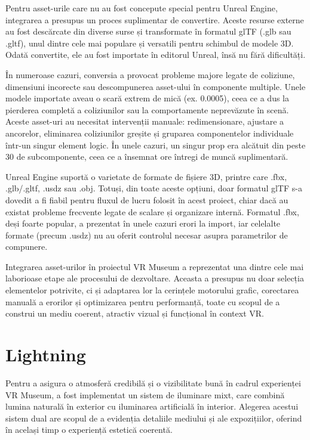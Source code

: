Pentru asset-urile care nu au fost concepute special pentru Unreal Engine, integrarea a presupus un proces suplimentar de convertire. Aceste resurse externe au fost descărcate din diverse surse și transformate în formatul glTF (.glb sau .gltf), unul dintre cele mai populare și versatili pentru schimbul de modele 3D. Odată convertite, ele au fost importate în editorul Unreal, însă nu fără dificultăți.

În numeroase cazuri, conversia a provocat probleme majore legate de coliziune, dimensiuni incorecte sau descompunerea asset-ului în componente multiple. Unele modele importate aveau o scară extrem de mică (ex. 0.0005), ceea ce a dus la pierderea completă a coliziunilor sau la comportamente neprevăzute în scenă. Aceste asset-uri au necesitat intervenții manuale: redimensionare, ajustare a ancorelor, eliminarea coliziunilor greșite și gruparea componentelor individuale într-un singur element logic. În unele cazuri, un singur prop era alcătuit din peste 30 de subcomponente, ceea ce a însemnat ore întregi de muncă suplimentară.

Unreal Engine suportă o varietate de formate de fișiere 3D, printre care .fbx, .glb/.gltf, .usdz sau .obj. Totuși, din toate aceste opțiuni, doar formatul glTF s-a dovedit a fi fiabil pentru fluxul de lucru folosit în acest proiect, chiar dacă au existat probleme frecvente legate de scalare și organizare internă. Formatul .fbx, deși foarte popular, a prezentat în unele cazuri erori la import, iar celelalte formate (precum .usdz) nu au oferit controlul necesar asupra parametrilor de compunere.

Integrarea asset-urilor în proiectul VR Museum a reprezentat una dintre cele mai laborioase etape ale procesului de dezvoltare. Aceasta a presupus nu doar selecția elementelor potrivite, ci și adaptarea lor la cerințele motorului grafic, corectarea manuală a erorilor și optimizarea pentru performanță, toate cu scopul de a construi un mediu coerent, atractiv vizual și funcțional în context VR.

\section{Lightning}

Pentru a asigura o atmosferă credibilă și o vizibilitate bună în cadrul experienței VR Museum, a fost implementat un sistem de iluminare mixt, care combină lumina naturală în exterior cu iluminarea artificială în interior. Alegerea acestui sistem dual are scopul de a evidenția detaliile mediului și ale expozițiilor, oferind în același timp o experiență estetică coerentă.

